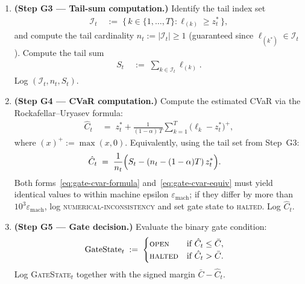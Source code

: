 \documentclass[12pt,openany]{book}
\numberwithin{equation}{chapter}
\theoremstyle{plain}
\theoremstyle{definition}
\theoremstyle{remark}
\numberwithin{equation}{chapter}
\theoremstyle{plain}
\begin{document}
\begin{enumerate}
  \item \textbf{(Step G3 --- Tail-sum computation.)}
        Identify the tail index set
        \begin{align}
          \mathcal{I}_t \;&:=\;
            \bigl\{\, k \in \{1,\ldots,T\}
              : \ell_{(k)} \geq z^*_t \,\bigr\},
            \label{eq:gate-tail-set}
        \end{align}
        and compute the tail cardinality
        $n_t := |\mathcal{I}_t| \geq 1$
        (guaranteed since $\ell_{(k^*)} \in \mathcal{I}_t$).
        Compute the tail sum
        \begin{align}
          S_t \;&:=\; \sum_{k \in \mathcal{I}_t} \ell_{(k)}.
            \label{eq:gate-tail-sum}
        \end{align}
        Log $(\mathcal{I}_t, n_t, S_t)$.

  \item \textbf{(Step G4 --- CVaR computation.)}
        Compute the estimated CVaR via the Rockafellar--Uryasev
        formula:
        \begin{align}
          \hat{C}_t
            \;&=\; z^*_t
              + \frac{1}{(1-\alpha)\,T}
                \sum_{k=1}^{T}
                  \bigl(\ell_k - z^*_t\bigr)^+,
            \label{eq:gate-cvar-formula}
        \end{align}
        where $(x)^+ := \max(x,0)$.  Equivalently, using the
        tail set from Step~G3:
        \begin{align}
          \hat{C}_t
            \;&=\; \frac{1}{n_t}
              \Bigl(
                S_t - (n_t - (1-\alpha)T)\,z^*_t
              \Bigr).
            \label{eq:gate-cvar-equiv}
        \end{align}
        Both forms~\eqref{eq:gate-cvar-formula}
        and~\eqref{eq:gate-cvar-equiv} must yield identical values
        to within machine epsilon $\varepsilon_{\mathrm{mach}}$;
        if they differ by more than $10^{3}\varepsilon_{\mathrm{mach}}$,
        log \textsc{numerical-inconsistency} and set gate state to
        \textsc{halted}.
        Log $\hat{C}_t$.

  \item \textbf{(Step G5 --- Gate decision.)}
        Evaluate the binary gate condition:
        \begin{align}
          \text{GateState}_t
            \;&:=\;
            \begin{cases}
              \textsc{open}
                & \text{if } \hat{C}_t \leq \bar{C},\\
              \textsc{halted}
                & \text{if } \hat{C}_t > \bar{C}.
            \end{cases}
            \label{eq:gate-state}
        \end{align}
        Log \textsc{GateState}$_t$ together with the signed
        margin $\bar{C} - \hat{C}_t$.


\end{enumerate}
\end{document}
